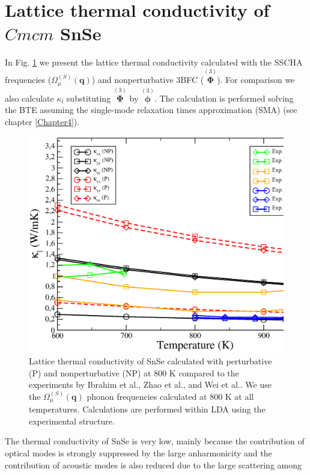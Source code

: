 \section{Lattice thermal conductivity of $Cmcm$ SnSe}

In Fig. \ref{thermal-snse} we present the lattice thermal conductivity calculated with the SSCHA frequencies ($\Omega^{(S)}_{\mu}(\boldsymbol{q})$) and nonperturbative 3BFC ($\overset{(3)}{\boldsymbol{\Phi}}$). For comparison 
we also calculate $\kappa_{l}$ substituting $\overset{(3)}{\boldsymbol{\Phi}}$ by $\overset{(3)}{\boldsymbol{\phi}}$. The calculation is performed solving the BTE assuming the single-mode relaxation times approximation (SMA) (see 
chapter \ref{Chapter4}).
\begin{figure}[h]
\includegraphics[width=\linewidth]{Figures/tk-SnSe.eps}
	\caption[Lattice thermal conductivity of SnSe]{Lattice thermal conductivity of SnSe calculated with perturbative (P) and nonperturbative (NP) at $800$ K compared to the experiments by Ibrahim et al.\cite{ibrahim2017reinvestigation}, Zhao et al.\cite{zhao2014ultralow}, and Wei et al.\cite{wei2019thermoelectric}. We use the $\Omega^{(S)}_{\mu}(\mathbf{q})$ phonon frequencies calculated at $800$ K at all temperatures. Calculations are performed within LDA using the experimental structure.}
\label{thermal-snse}
\end{figure}
The thermal conductivity of SnSe is very low, mainly because the contribution of optical modes is strongly suppressed by the large anharmonicity and the contribution of acoustic modes is also reduced due to the large scattering among 
